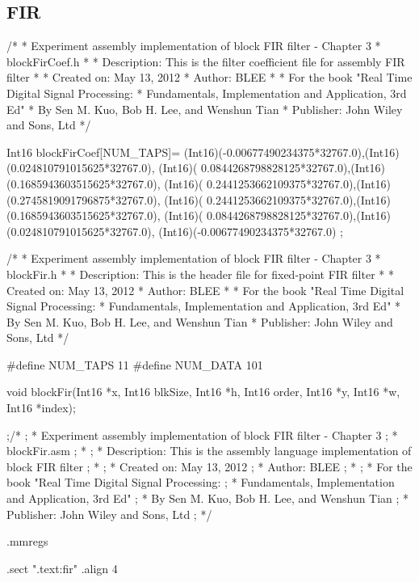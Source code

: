 \documentclass{bannerReport}
\begin{document}
	\subsection{FIR}
		\begin{code}
/*
* Experiment assembly implementation of block FIR filter - Chapter 3
* blockFirCoef.h
*
* Description: This is the filter coefficient file for assembly FIR filter
*
*  Created on: May 13, 2012
*      Author: BLEE
*
* 		For the book "Real Time Digital Signal Processing:
*                    Fundamentals, Implementation and Application, 3rd Ed"
* 		              By Sen M. Kuo, Bob H. Lee, and Wenshun Tian
* 		              Publisher: John Wiley and Sons, Ltd
*/

Int16 blockFirCoef[NUM_TAPS]={
(Int16)(-0.00677490234375*32767.0),(Int16)(0.024810791015625*32767.0),
(Int16)( 0.0844268798828125*32767.0),(Int16)(0.1685943603515625*32767.0),
(Int16)( 0.2441253662109375*32767.0),(Int16)(0.2745819091796875*32767.0),
(Int16)( 0.2441253662109375*32767.0),(Int16)(0.1685943603515625*32767.0),
(Int16)( 0.0844268798828125*32767.0),(Int16)(0.024810791015625*32767.0),
(Int16)(-0.00677490234375*32767.0)
};


/*
* Experiment assembly implementation of block FIR filter - Chapter 3
* blockFir.h
*
* Description: This is the header file for fixed-point FIR filter
*
*  Created on: May 13, 2012
*      Author: BLEE
*
* 		For the book "Real Time Digital Signal Processing:
*                    Fundamentals, Implementation and Application, 3rd Ed"
* 		              By Sen M. Kuo, Bob H. Lee, and Wenshun Tian
* 		              Publisher: John Wiley and Sons, Ltd
*/

#define  NUM_TAPS   11
#define  NUM_DATA   101

void blockFir(Int16 *x, Int16 blkSize,
				Int16 *h, Int16 order,
				Int16 *y,
				Int16 *w, Int16 *index);

;/*
; * Experiment assembly implementation of block FIR filter - Chapter 3
; * blockFir.asm
; *
; * Description: This is the assembly language implementation of block FIR filter
; *
; *  Created on: May 13, 2012
; *      Author: BLEE
; *
; * 		For the book "Real Time Digital Signal Processing:
; *                       Fundamentals, Implementation and Application, 3rd Ed"
; * 		              By Sen M. Kuo, Bob H. Lee, and Wenshun Tian
; * 		              Publisher: John Wiley and Sons, Ltd
; */

	.mmregs 
	
	.sect	".text:fir"
	.align 4


\end{code}
\end{document}
